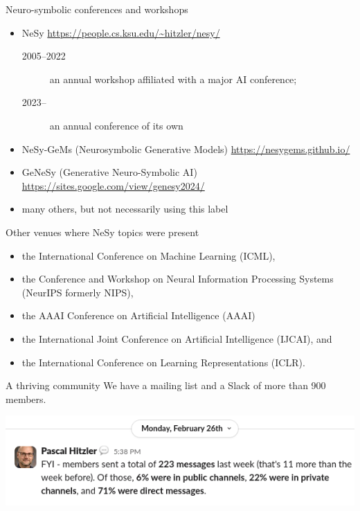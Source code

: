 \documentclass{lecture}
\begin{document}
\begin{frame}{Neuro-symbolic conferences and workshops}
    \begin{itemize}
        \item NeSy \url{https://people.cs.ksu.edu/~hitzler/nesy/}
        \begin{description}
            \item[2005--2022] an annual workshop affiliated with a major AI conference;
            \item[2023--] an annual conference of its own
        \end{description}             
        \item NeSy-GeMs (Neurosymbolic Generative Models) \url{https://nesygems.github.io/}
        \item GeNeSy (Generative Neuro-Symbolic AI) \url{https://sites.google.com/view/genesy2024/}
        \item many others, but not necessarily using this label
    \end{itemize}
\end{frame}

\begin{frame}{Other venues where NeSy topics were present}
    \begin{itemize}
        \item the International Conference on Machine Learning (ICML),
        \item  the Conference and Workshop on Neural Information Processing Systems (NeurIPS formerly NIPS),
        \item  the AAAI Conference on Artificial Intelligence (AAAI)
        \item  the International Joint Conference on Artificial Intelligence (IJCAI), and
        \item the International Conference on Learning Representations (ICLR).
    \end{itemize}
\end{frame}

\begin{frame}{A thriving community}
    We have a \alert{mailing list} and a \alert{Slack} of more than 900 members.

    \vspace{1cm}
    \includegraphics[width=\textwidth]{slack20240226.png}
\end{frame}
\end{document}

